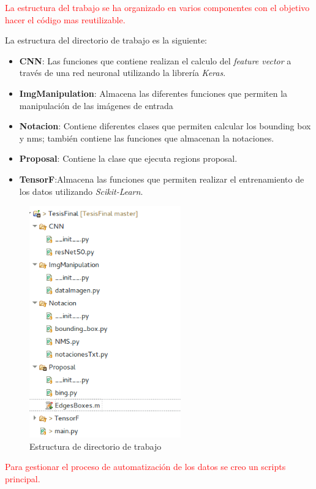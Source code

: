 \textcolor{red}{ La estructura del trabajo se ha organizado en varios componentes con el objetivo hacer el código mas reutilizable. }

La estructura del directorio de trabajo es la siguiente:
\begin{itemize}
 \item \textbf{CNN}: Las funciones que contiene realizan el calculo del \textit{feature vector} a través de una red neuronal utilizando la librería 
\textit{Keras}.
 \item \textbf{ImgManipulation}: Almacena las diferentes funciones que permiten la manipulación de las imágenes de entrada 
 \item \textbf{Notacion}: Contiene diferentes clases que permiten calcular los bounding box y \ac{nms}; también contiene las funciones que almacenan 
la notaciones.
 \item \textbf{Proposal}: Contiene la clase que ejecuta regions proposal.
 \item \textbf{TensorF}:Almacena las funciones que permiten realizar el entrenamiento de los datos utilizando \textit{Scikit-Learn}.
\end{itemize}

\begin{figure}[H]
 \centering
  \includegraphics[height=10cm,keepaspectratio=true,clip=true]{imagenes/Logos/structureData.png}
  \caption{Estructura de directorio de trabajo}
\end{figure}

\textcolor{red}{ Para gestionar el proceso de automatización de los datos se creo un scripts principal.}


